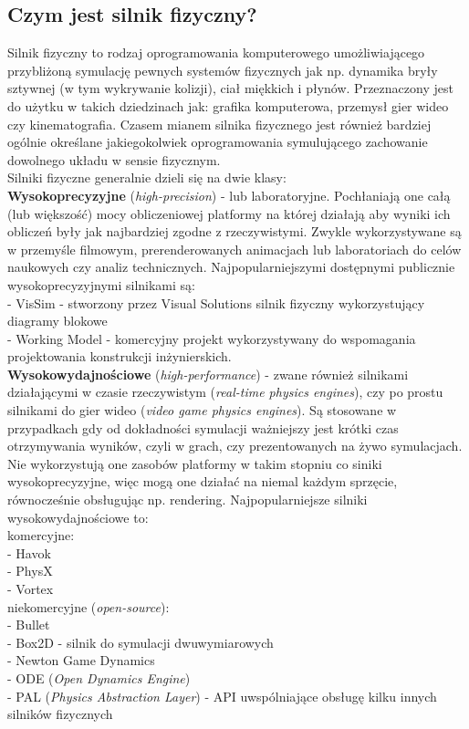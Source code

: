   \subsection{Czym jest silnik fizyczny?}\label{subsec:czymJestSilnik}
Silnik fizyczny to rodzaj oprogramowania komputerowego umożliwiającego
przybliżoną symulację pewnych systemów fizycznych jak np. dynamika bryły
sztywnej (w tym wykrywanie kolizji), ciał miękkich i płynów. Przeznaczony jest
do użytku w takich dziedzinach jak: grafika komputerowa, przemysł gier wideo czy
kinematografia. Czasem mianem silnika fizycznego jest również bardziej ogólnie
określane jakiegokolwiek oprogramowania symulującego zachowanie dowolnego
układu w sensie fizycznym.\\
Silniki fizyczne generalnie dzieli się na dwie klasy:\\
\textbf{Wysokoprecyzyjne} (\emph{high-precision}) - lub laboratoryjne.
Pochłaniają one całą (lub większość) mocy obliczeniowej platformy na której
działają aby wyniki ich obliczeń były jak najbardziej zgodne z rzeczywistymi.
Zwykle wykorzystywane są w przemyśle filmowym, prerenderowanych animacjach lub
laboratoriach do celów naukowych czy analiz technicznych. Najpopularniejszymi
dostępnymi publicznie wysokoprecyzyjnymi silnikami są:\\
- VisSim - stworzony przez Visual Solutions silnik fizyczny wykorzystujący
diagramy blokowe\\
- Working Model - komercyjny projekt wykorzystywany do wspomagania projektowania
konstrukcji inżynierskich.\\
\textbf{Wysokowydajnościowe} (\emph{high-performance})
- zwane również silnikami działającymi w czasie rzeczywistym (\emph{real-time
physics engines}), czy po prostu silnikami do gier wideo (\emph{video game
physics engines}). Są stosowane w przypadkach gdy od dokładności symulacji
ważniejszy jest krótki czas otrzymywania wyników, czyli w grach, czy
prezentowanych na żywo symulacjach. Nie wykorzystują one zasobów platformy w
takim stopniu co siniki wysokoprecyzyjne, więc mogą one działać na niemal każdym
sprzęcie, równocześnie obsługując np. rendering. Najpopularniejsze silniki
wysokowydajnościowe to:\\
komercyjne:\\
- Havok\\
- PhysX\\
- Vortex\\
niekomercyjne (\emph{open-source}):\\
- Bullet\\
- Box2D - silnik do symulacji dwuwymiarowych\\
- Newton Game Dynamics\\
- ODE (\emph{Open Dynamics Engine})\\
- PAL (\emph{Physics Abstraction Layer}) - API uwspólniające obsługę kilku
innych silników fizycznych\\

